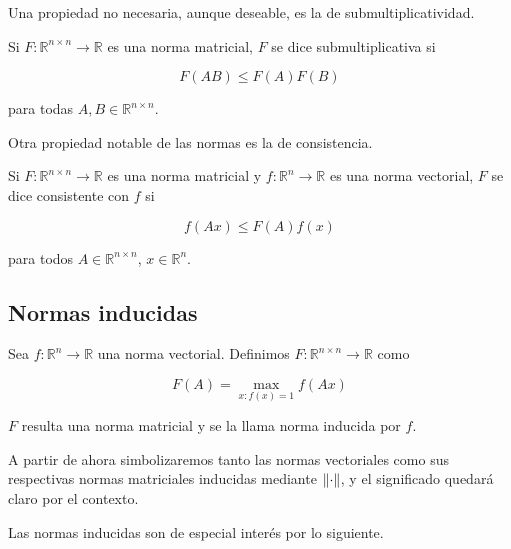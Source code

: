 Una propiedad no necesaria, aunque deseable, es la de submultiplicatividad.

\begin{defi}
Si $F : \mathbb{R}^{n \times n} \to \mathbb{R}$ es una norma matricial, $F$ se dice submultiplicativa si

\[F(AB) \leq F(A)F(B)\]

para todas $A, B \in \mathbb{R}^{n \times n}$.
\end{defi}

Otra propiedad notable de las normas es la de consistencia.

\begin{defi}
Si $F : \mathbb{R}^{n \times n} \to \mathbb{R}$ es una norma matricial y $f : \mathbb{R}^n \to \mathbb{R}$ es una norma vectorial, $F$ se dice consistente con $f$ si

\[f(Ax) \leq F(A)f(x)\]

para todos $A \in \mathbb{R}^{n \times n}$, $x \in \mathbb{R}^n$.
\end{defi}

\subsection{Normas inducidas}

\begin{defi}
Sea $f : \mathbb{R}^n \to \mathbb{R}$ una norma vectorial. Definimos $F : \mathbb{R}^{n \times n} \to \mathbb{R}$ como

\[
F(A) = \max\limits_{x : f(x) = 1} f(Ax)
\]

$F$ resulta una norma matricial y se la llama norma inducida por $f$.
\end{defi}

A partir de ahora simbolizaremos tanto las normas vectoriales como sus respectivas normas matriciales inducidas mediante $\left\lVert\cdot\right\rVert$, y el significado quedará claro por el contexto.

Las normas inducidas son de especial interés por lo siguiente.

